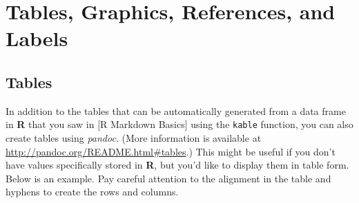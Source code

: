 \documentclass[12pt,twoside]{reedthesis}
\theoremstyle{definition}
\theoremstyle{definition}
\theoremstyle{remark}
\begin{document}
  \chapter{Tables, Graphics, References, and Labels}\label{ref-labels}
  
  \section{Tables}\label{tables}
  
  In addition to the tables that can be automatically generated from a
  data frame in \textbf{R} that you saw in {[}R Markdown Basics{]} using
  the \texttt{kable} function, you can also create tables using
  \emph{pandoc}. (More information is available at
  \url{http://pandoc.org/README.html\#tables}.) This might be useful if
  you don't have values specifically stored in \textbf{R}, but you'd like
  to display them in table form. Below is an example. Pay careful
  attention to the alignment in the table and hyphens to create the rows
  and columns.
  
\end{document}
